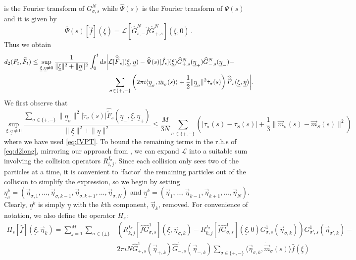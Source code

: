 \documentclass{article}
\newcommand\uxi{{\underline \xi}}
\newcommand\ueta{{\underline \eta}}
\newcommand\veta{{\vec \eta}}
\DeclarePairedDelimiter{\scal}{\langle}{\rangle}
\begin{document}
%
is the Fourier transform of $ G_{\sigma,s}^N$ while $\widehat\Psi(s)$ is the Fourier transform of $\Psi(s)$ and it
is given  by
%
\[
\widehat\Psi(s)[\hat{f}](\uxi)=\mathcal L[\widehat G_{s,-}^N\hat{f}\widehat G_{+,s}^N]( \uxi,0)\, .
\]
%
Thus we obtain%
%
\begin{equation}\label{eq:d2long}
\begin{aligned}
d_2(F_t, \widetilde F_t) \leq 
\sup_{\underline \xi, \underline \eta \ne 0} \frac{1}{\|\underline \xi\|^2 + \|\underline\eta\|^2 }\int_0^t ds
\bigg|&\mathcal L [\widehat {\widetilde F}_s](\uxi,\ueta) - 
\widehat\Psi(s) [\hat{f}_s](\uxi) \widehat G_{+,s}^N(\ueta_+)\widehat G_{-,s}^N(\ueta_-) - \\
& \sum_{\sigma\in\{+,-\}}\left(2\pi i\scal{\ueta_\sigma, \dot 
{\underline m}_\sigma(s)}+\frac 12\|\ueta_\sigma\|^2\dot \tau_\sigma(s)\right)\widehat {\widetilde
F}_s(\uxi,\ueta)\bigg| .\end{aligned}
\end{equation}
%
We first observe that
\begin{equation}\label{eq:dottau}
\sup_{\underline \xi, \underline \eta \ne 0} \frac{ \sum_{\sigma\in\{+,-\}}\|\ueta_\sigma\|^2|\dot 
\tau_\sigma(s)|\widehat {\widetilde
F}_s(\ueta_-,\uxi,\ueta_+)}{\|\underline \xi\|^2 + \|\underline\eta\|^2 }\leq \frac {M}{3N}\sum_{\sigma\in\{+,-\}}
\left( |\tau_\sigma(s) - \tau_S(s)|+\frac{1}{3} \|\vec m_\sigma(s)-\vec m_S(s)\|^2\right)
\end{equation}
where we have used \eqref{eq:IVPT}. To bound the remaining terms in the r.h.s of \eqref{eq:d2long}, mirroring our
approach from \cite{BLP25}, we can expand $\mathcal L$ into a suitable sum involving the collision operators
$R^{I_\sigma}_{i,j}$. Since each collision only sees two of the particles at a time, it is convenient to `factor' the
remaining particles out of the collision to simplify the expression, so we begin by setting
$\ueta_\sigma^k=(\veta_{\sigma,1},\ldots,\veta_{\sigma,k-1},\veta_{\sigma,k+1},\ldots,\veta_{\sigma,N})$ and
$\ueta^k=(\veta_{1},\ldots,\veta_{k-1},\veta_{k+1},\ldots,\veta_{N})$. Clearly, $\underline \eta^k$ is simply
$\underline \eta$ with the $k$th component, $\veta_{k}$, removed. %
For convenience of notation, we also define the operator $H_s$: %
\begin{equation}\label{eq:H}
\begin{aligned}
H_{s}[\hat f](\underline \xi, \vec\eta_{k}) =\sum_{j = 1}^M\sum_{\sigma\in\{\pm\}}&\left( R^{I_\sigma}_{k,j}[\hat 
{f}\widehat G_{\sigma,s}^1](\underline \xi, \veta_{\sigma,k}) - 
R^{I_\sigma}_{k,j}[\hat 
{f}\widehat G_{\sigma,s}^1](\underline \xi, 
0)G_{\sigma,s}^1(\veta_{\sigma,k})\right)G_{\sigma',s}^1(\veta_{\sigma',k})-\\
& 2\pi i N \widehat G_{+,s}^1(\veta_{+,k})\widehat G_{-,s}^1(\veta_{-,k})\sum_{\sigma\in\{+,-\}}\langle\vec 
\eta_{\sigma,k}, \dot{\vec m}_\sigma(s)\rangle\hat {f}(\underline \xi)
\end{aligned}
\end{equation}
\end{document}
